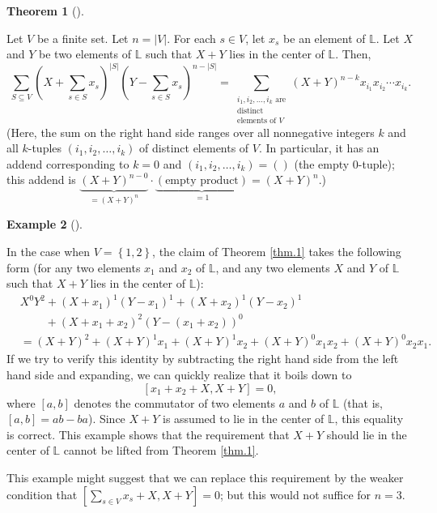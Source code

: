 \documentclass[numbers=enddot,12pt,final,onecolumn,notitlepage]{scrartcl}%
\theoremstyle{definition}
\newtheorem{theo}{Theorem}[section]
\newenvironment{theorem}[1][]
{\begin{theo}[#1]\begin{leftbar}}
{\end{leftbar}\end{theo}}
\newtheorem{exam}[theo]{Example}
\newenvironment{example}[1][]
{\begin{exam}[#1]\begin{leftbar}}
{\end{leftbar}\end{exam}}
\let\sumnonlimits\sum
\renewcommand{\sum}{\sumnonlimits\limits}
\begin{document}
\begin{theorem}
\label{thm.1}Let $V$ be a finite set. Let $n=\left\vert V\right\vert $. For
each $s\in V$, let $x_{s}$ be an element of $\mathbb{L}$. Let $X$ and $Y$ be
two elements of $\mathbb{L}$ such that $X+Y$ lies in the center of
$\mathbb{L}$. Then,%
\[
\sum_{S\subseteq V}\left(  X+\sum_{s\in S}x_{s}\right)  ^{\left\vert
S\right\vert }\left(  Y-\sum_{s\in S}x_{s}\right)  ^{n-\left\vert S\right\vert
}=\sum_{\substack{i_{1},i_{2},\ldots,i_{k}\text{ are}\\\text{distinct}%
\\\text{elements of }V}}\left(  X+Y\right)  ^{n-k}x_{i_{1}}x_{i_{2}}\cdots
x_{i_{k}}.
\]
(Here, the sum on the right hand side ranges over all nonnegative integers $k$
and all $k$-tuples $\left(  i_{1},i_{2},\ldots,i_{k}\right)  $ of distinct
elements of $V$. In particular, it has an addend corresponding to $k=0$ and
$\left(  i_{1},i_{2},\ldots,i_{k}\right)  =\left(  {}\right)  $ (the empty
$0$-tuple); this addend is $\underbrace{\left(  X+Y\right)  ^{n-0}}_{=\left(
X+Y\right)  ^{n}}\cdot\underbrace{\left(  \text{empty product}\right)  }%
_{=1}=\left(  X+Y\right)  ^{n}$.)
\end{theorem}

\begin{example}
In the case when $V=\left\{  1,2\right\}  $, the claim of Theorem \ref{thm.1}
takes the following form (for any two elements $x_{1}$ and $x_{2}$ of
$\mathbb{L}$, and any two elements $X$ and $Y$ of $\mathbb{L}$ such that $X+Y$
lies in the center of $\mathbb{L}$):%
\begin{align*}
&  X^{0}Y^{2}+\left(  X+x_{1}\right)  ^{1}\left(  Y-x_{1}\right)  ^{1}+\left(
X+x_{2}\right)  ^{1}\left(  Y-x_{2}\right)  ^{1}\\
&  \ \ \ \ \ \ \ \ \ \ +\left(  X+x_{1}+x_{2}\right)  ^{2}\left(  Y-\left(
x_{1}+x_{2}\right)  \right)  ^{0}\\
&  =\left(  X+Y\right)  ^{2}+\left(  X+Y\right)  ^{1}x_{1}+\left(  X+Y\right)
^{1}x_{2}+\left(  X+Y\right)  ^{0}x_{1}x_{2}+\left(  X+Y\right)  ^{0}%
x_{2}x_{1}.
\end{align*}
If we try to verify this identity by subtracting the right hand side from the
left hand side and expanding, we can quickly realize that it boils down to%
\[
\left[  x_{1}+x_{2}+X,X+Y\right]  =0,
\]
where $\left[  a,b\right]  $ denotes the commutator of two elements $a$ and
$b$ of $\mathbb{L}$ (that is, $\left[  a,b\right]  =ab-ba$). Since $X+Y$ is
assumed to lie in the center of $\mathbb{L}$, this equality is correct. This
example shows that the requirement that $X+Y$ should lie in the center of
$\mathbb{L}$ cannot be lifted from Theorem \ref{thm.1}.

This example might suggest that we can replace this requirement by the weaker
condition that $\left[  \sum_{s\in V}x_{s}+X,X+Y\right]  =0$; but this would
not suffice for $n=3$.
\end{example}
\end{document}
